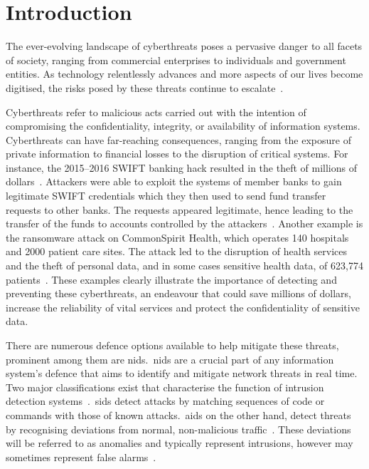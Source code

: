 \chapter{Introduction}%
\label{chp:introduction}


The ever-evolving landscape of cyberthreats poses a pervasive danger to all
facets of society, ranging from commercial enterprises to individuals and
government entities. As technology relentlessly advances and more aspects of
our lives become digitised, the risks posed by these threats continue to
escalate~\cite{ENISA}.

Cyberthreats refer to malicious acts carried out with the intention of
compromising the confidentiality, integrity, or availability of information
systems. Cyberthreats can have far-reaching consequences, ranging from the
exposure of private information to financial losses to the disruption of
critical systems. For instance, the 2015--2016 SWIFT banking hack resulted in
the theft of millions of dollars~\cite{swift_attack1, swift_attack2}. Attackers
were able to exploit the systems of member banks to gain legitimate SWIFT
credentials which they then used to send fund transfer requests to other banks.
The requests appeared legitimate, hence leading to the transfer of the funds to
accounts controlled by the attackers~\cite{swift_attack1}. Another example is
the ransomware attack on CommonSpirit Health, which operates 140 hospitals and
2000 patient care sites. The attack led to the disruption of health services
and the theft of personal data, and in some cases sensitive health data, of
623,774 patients~\cite{commonspirit1, commonspirit2, commonspirit3}. These
examples clearly illustrate the importance of detecting and preventing these
cyberthreats, an endeavour that could save millions of dollars, increase the
reliability of vital services and protect the confidentiality of sensitive
data.

There are numerous defence options available to help mitigate these threats,
prominent among them are \gls{nids}.\ \gls{nids} are a crucial part of any
information system's defence that aims to identify and mitigate network threats
in real time. Two major classifications exist that characterise the function of
intrusion detection systems~\cite{survey1}.\ \gls{sids} detect attacks by
matching sequences of code or commands with those of known attacks.\ \gls{aids}
on the other hand, detect threats by recognising deviations from normal,
non-malicious traffic~\cite{survey1}. These deviations will be referred to as
anomalies and typically represent intrusions, however may sometimes represent
false alarms~\cite{anomaly}.

